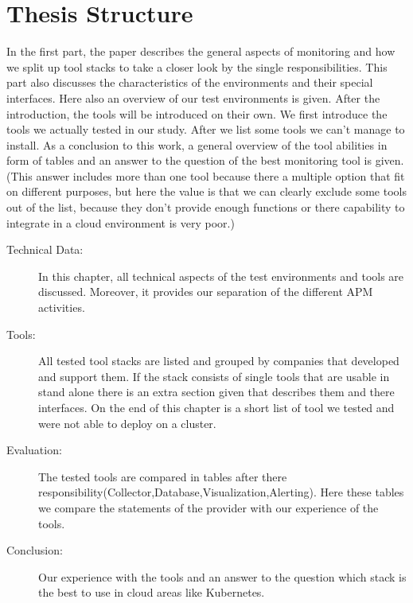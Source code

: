 \section{Thesis Structure}
In the first part, the paper describes the general aspects of monitoring and how we split up tool stacks to take a closer look by the single responsibilities. This part also discusses the characteristics of the environments and their special interfaces. Here also an overview of our test environments is given. After the introduction, the tools will be introduced on their own. We first introduce the tools we actually tested in our study. After we list some tools we can't manage to install. As a conclusion to this work, a general overview  of the tool abilities in form of tables and an answer to the question of the best monitoring tool is given. (This answer includes more than one tool because there a multiple option that fit on different purposes, but here the value is that we can clearly exclude some tools out of the list, because they don't provide enough functions or there capability to integrate in a cloud environment is very poor.)
\begin{description}
\item[Technical Data:] In this chapter, all technical aspects of the test environments and tools are discussed. Moreover, it provides our separation of the different APM activities. 
\item[Tools:] All tested tool stacks are listed and grouped by companies that developed and support them. If the stack consists of single tools that are usable in stand alone there is an extra section given that describes them and there interfaces. On the end of this chapter is a short list of tool we tested and were not able to deploy on a cluster.
\item[Evaluation:]The tested tools are compared in tables after there responsibility(Collector,Database,Visualization,Alerting). Here these tables we compare the statements of the provider with our experience of the tools.
\item[Conclusion:] Our experience with the tools and an answer to the question which stack is the best to use in cloud areas like Kubernetes.

\end{description}

